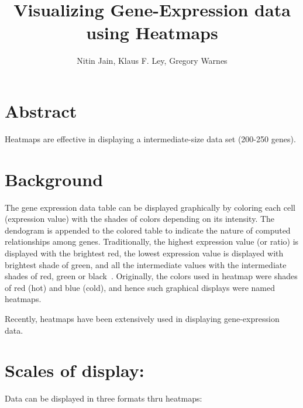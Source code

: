 \documentclass[12pt, oneside, letterpaper]{article}
\begin{document}
\title{Visualizing Gene-Expression data using Heatmaps}
\author{Nitin Jain,  Klaus F. Ley, Gregory Warnes}

\maketitle

\section*{Abstract}
Heatmaps are
effective in displaying a intermediate-size data set (200-250
genes). 

\section*{Background}

The gene expression data table can be displayed graphically by
coloring each cell (expression value) with the shades of colors
depending on its intensity. The dendogram is appended to the colored
table to indicate the nature of computed relationships among
genes. Traditionally, the highest expression value (or ratio) is
displayed with the brightest red, the lowest expression value is
displayed with brightest shade of green, and all the intermediate
values with the intermediate shades of red, green or
black~\cite{Eisen1998}.  Originally, the colors used in heatmap were
shades of red (hot) and blue (cold), and hence such graphical displays were
named heatmaps. 

Recently, heatmaps have been extensively used in displaying
gene-expression data. 

\section*{Scales of display:}
Data can be displayed in three formats thru heatmaps:
\end{document}
